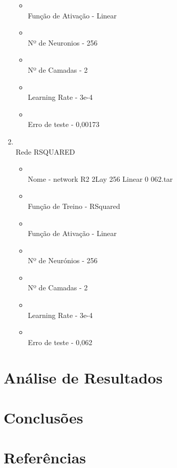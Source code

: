 \documentclass[10pt]{article}
\begin{document}
\begin{enumerate}
\begin{itemize}
    \item\\Função de Ativação - Linear
    \item\\Nº de Neuronios - 256
    \item\\Nº de Camadas - 2
    \item\\Learning Rate - 3e-4
    \item\\Erro de teste - 0,00173
  \end{itemize}
  \vspace{2cm}
  \item\\Rede RSQUARED
  \begin{itemize}
    \item\\Nome - network R2 2Lay 256 Linear 0 062.tar
    \item\\Função de Treino - RSquared
    \item\\Função de Ativação - Linear
    \item\\Nº de Neurónios - 256
    \item\\Nº de Camadas - 2
    \item\\Learning Rate - 3e-4
    \item\\Erro de teste - 0,062   
  \end{itemize}
\end{enumerate}
  \newpage

\section{Análise de Resultados}\label{sec:ev-da-org}

\vspace{6cm}
\section{Conclusões}\label{sec:an-da-info-fin-da-org}

\vspace{3cm}

\newpage

\section{Referências}\label{sec:sup-inf-utl}
\cite{Binance:2021}



\pagebreak
\end{document}
